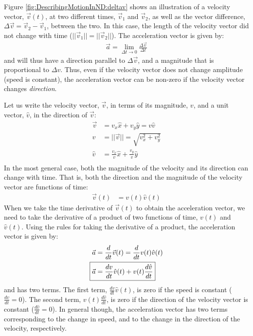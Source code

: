Figure \ref{fig:DescribingMotionInND:deltav} shows an illustration of a velocity vector, $\vec v(t)$, at two different times, $\vec v_1$ and $\vec v_2$, as well as the vector difference, $\Delta \vec v=\vec v_2 - \vec v_1$, between the two. In this case, the length of the velocity vector did not change with time ($||\vec v_1||=||\vec v_2||$). The acceleration vector is given by:
\begin{align*}
\vec a = \lim_{\Delta t\to 0}\frac{\Delta \vec v}{\Delta t}
\end{align*}
and will thus have a direction parallel to $\Delta \vec v$, and a magnitude that is proportional to $\Delta v$. Thus, even if the velocity vector does not change amplitude (speed is constant), the acceleration vector can be non-zero if the velocity vector changes \textit{direction}.

Let us write the velocity vector, $\vec v$, in terms of its magnitude, $v$, and a unit vector, $\hat v$, in the direction of $\vec v$:
\begin{align*}
\vec v &=v_x\hat x+v_y\hat y= v \hat v\\
v&=||\vec v||=\sqrt{v_x^2+v_y^2}\\
\hat v &= \frac{v_x}{v}\hat x+\frac{v_y}{v}\hat y\\
\end{align*}
In the most general case, both the magnitude of the velocity and its direction can change with time. That is, both the direction and the magnitude of the velocity vector are functions of time:
\begin{align*}
\vec v(t)&=v(t)\hat v(t)
\end{align*}
When we take the time derivative of $\vec v(t)$ to obtain the acceleration vector, we need to take the derivative of a product of two functions of time, $v(t)$ and $\hat v(t)$. Using the rules for taking the derivative of a product, the acceleration vector is given by:
\begin{align}
\label{eqn:DescribingMotionInND:avecdef2}
\vec a &= \frac{d}{dt}\vec v(t)= \frac{d}{dt}v(t)\hat v(t)\nonumber\\
\Aboxed{\vec a&=\frac{dv}{dt}\hat v(t)+v(t)\frac{d\hat v}{dt}}
\end{align}
and has two terms. The first term, $\frac{dv}{dt}\hat v(t)$, is zero if the speed is constant ($\frac{dv}{dt}=0$). The second term, $v(t)\frac{d\hat v}{dt}$, is zero if the direction of the velocity vector is constant ($\frac{d\hat v}{dt}=0$). In general though, the acceleration vector has two terms corresponding to the change in speed, and to the change in the direction of the velocity, respectively.

